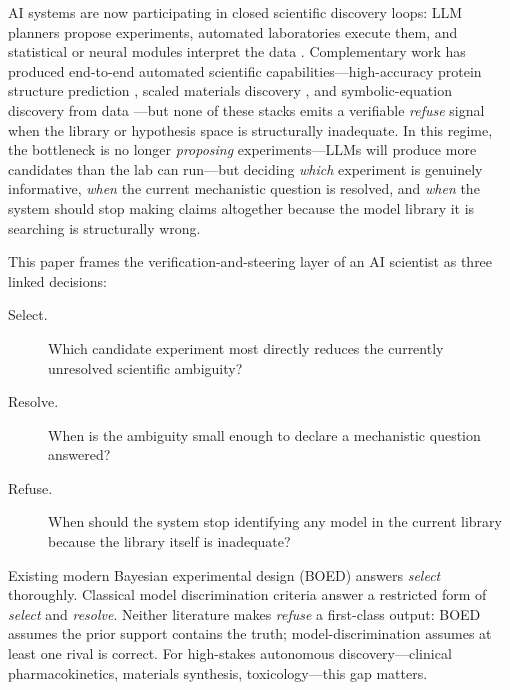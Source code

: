 \documentclass{article}
\theoremstyle{plain}
\theoremstyle{definition}
\theoremstyle{remark}
\begin{document}
AI systems are now participating in closed scientific discovery loops: LLM
planners propose experiments, automated laboratories execute them, and
statistical or neural modules interpret the data
\citep{king2009robot,burger2020mobile,boiko2023coscientist,szymanski2023alab,lu2024aiscientist,bran2023chemcrow,wang2023scientific}.
Complementary work has produced end-to-end automated scientific
capabilities---high-accuracy protein structure prediction
\citep{jumper2021alphafold}, scaled materials discovery
\citep{merchant2023gnome}, and symbolic-equation discovery from data
\citep{schmidt2009distilling,brunton2016sindy,udrescu2020aifeynman,cranmer2020pysr}---but
none of these stacks emits a verifiable \emph{refuse} signal when
the library or hypothesis space is structurally inadequate.
In this regime, the bottleneck is no longer \emph{proposing} experiments---LLMs
will produce more candidates than the lab can run---but deciding
\emph{which} experiment is genuinely informative, \emph{when} the current
mechanistic question is resolved, and \emph{when} the system should stop
making claims altogether because the model library it is searching is
structurally wrong.

This paper frames the verification-and-steering layer of an AI scientist as
three linked decisions:

\begin{description}
\item[Select.] Which candidate experiment most directly reduces the currently
unresolved scientific ambiguity?
\item[Resolve.] When is the ambiguity small enough to declare a mechanistic
question answered?
\item[Refuse.] When should the system stop identifying any model in the
current library because the library itself is inadequate?
\end{description}

Existing modern Bayesian experimental design (BOED)
\citep{chaloner1995review,ryan2016review,rainforth2024modern,foster2019variational,kleinegesse2020mine,blau2022rl,foster2021deep}
answers \emph{select} thoroughly. Classical model discrimination criteria
\citep{boxhill1967,atkinsonfedorov1975,pukelsheim2006optimal} answer a
restricted form of \emph{select} and \emph{resolve}. Neither literature makes
\emph{refuse} a first-class output: BOED assumes the prior support contains
the truth; model-discrimination assumes at least one rival is correct. For
high-stakes autonomous discovery---clinical pharmacokinetics, materials
synthesis, toxicology---this gap matters.
\end{document}
